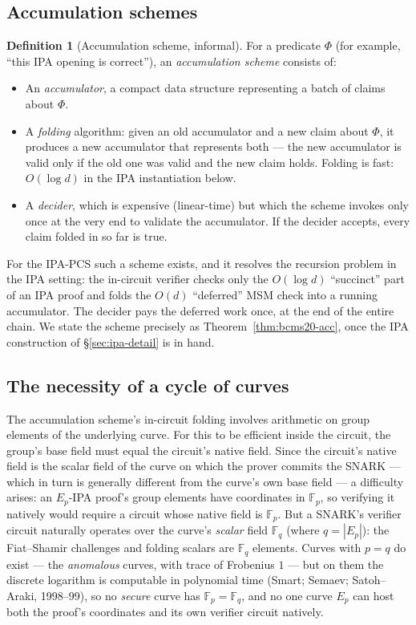 \documentclass[11pt,a4paper]{article}
\theoremstyle{definition}
\newtheorem{definition}[theorem]{Definition}
\newcommand{\F}{\mathbb{F}}
\begin{document}
\subsection{Accumulation schemes}

\begin{definition}[Accumulation scheme, informal]\label{def:acc}
For a predicate $\Phi$ (for example, ``this IPA opening is correct''), an
\emph{accumulation scheme} consists of:
\begin{itemize}[leftmargin=*]
\item An \emph{accumulator}, a compact data structure representing a batch
of claims about $\Phi$.
\item A \emph{folding} algorithm: given an old accumulator and a new claim
about $\Phi$, it produces a new accumulator that represents both --- the
new accumulator is valid only if the old one was valid and the new claim
holds. Folding is fast: $O(\log d)$ in the IPA instantiation below.
\item A \emph{decider}, which is expensive (linear-time) but which the scheme
invokes only once at
the very end to validate the accumulator. If the decider accepts, every
claim folded in so far is true.
\end{itemize}
\end{definition}

For the IPA-PCS such a scheme exists, and it resolves the recursion
problem in the IPA setting: the in-circuit verifier checks only the
$O(\log d)$ ``succinct'' part of an IPA proof and folds the $O(d)$
``deferred'' MSM check into a running accumulator. The decider pays the
deferred work once, at the end of the entire chain. We state the scheme
precisely as Theorem~\ref{thm:bcms20-acc}, once the IPA construction of
\S\ref{sec:ipa-detail} is in hand.

\subsection{The necessity of a cycle of curves}\label{sec:cycle}

The accumulation scheme's in-circuit folding involves arithmetic on group
elements of the underlying curve. For this to be efficient inside the
circuit, the group's base field must equal the circuit's native field.
Since the circuit's native field is the scalar field of the curve on which
the prover commits the SNARK --- which in turn is generally different from the
curve's own base field --- a difficulty arises: an $E_p$-IPA proof's group
elements have coordinates in $\F_p$, so verifying it natively would require
a circuit whose native field is $\F_p$. But a SNARK's verifier circuit
naturally operates over the curve's \emph{scalar} field $\F_q$ (where
$q = |E_p|$): the Fiat--Shamir challenges and folding scalars are $\F_q$
elements. Curves with $p = q$ do exist --- the \emph{anomalous} curves,
with trace of Frobenius $1$ --- but on them the discrete logarithm is
computable in polynomial time (Smart; Semaev; Satoh--Araki, 1998--99), so
no \emph{secure} curve has $\F_p = \F_q$, and no one curve $E_p$ can host
both the proof's coordinates and its own verifier circuit natively.
\end{document}
